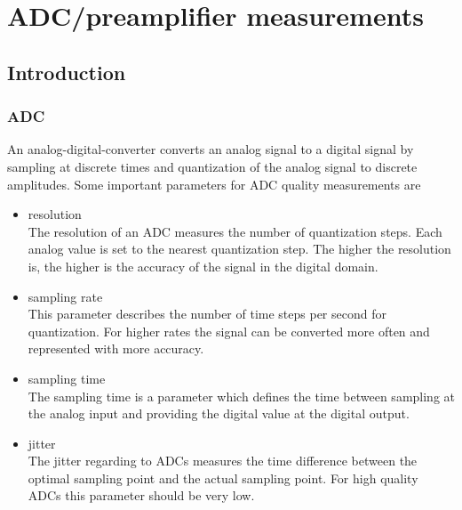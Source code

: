 \documentclass[11pt]{report}
\begin{document}
\chapter{ADC/preamplifier measurements}
\section{Introduction}
\subsection{ADC}
An analog-digital-converter converts an analog signal to a digital signal by sampling at discrete times and quantization of the analog signal to discrete amplitudes. Some important parameters for ADC quality measurements are
\begin{itemize}
\item resolution\\
The resolution of an ADC measures the number of quantization steps. Each analog value is set to the nearest quantization step. The higher the resolution is, the higher is the accuracy of the signal in the digital domain.
\item sampling rate\\
This parameter describes the number of time steps per second for quantization. For higher rates the signal can be converted more often and represented with more accuracy.
\item sampling time\\
The sampling time is a parameter which defines the time between sampling at the analog input and providing the digital value at the digital output.
\item jitter\\
The jitter regarding to ADCs measures the time difference between the optimal sampling point and the actual sampling point. For high quality ADCs this parameter should be very low.
\end{itemize}
\end{document}
